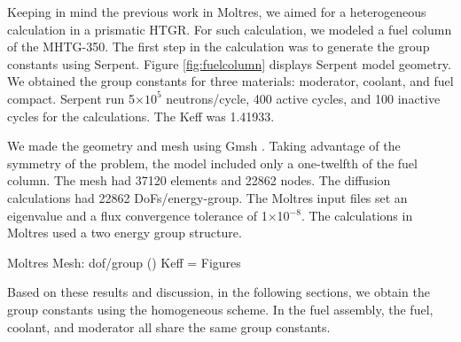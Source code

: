 \documentclass[11pt,letterpaper]{article}
\begin{document}
Keeping in mind the previous work in Moltres, we aimed for a heterogeneous calculation in a prismatic \gls{HTGR}.
For such calculation, we modeled a fuel column of the MHTG-350.
The first step in the calculation was to generate the group constants using Serpent.
Figure \ref{fig:fuelcolumn} displays Serpent model geometry.
We obtained the group constants for three materials: moderator, coolant, and fuel compact.
Serpent run 5$\times 10^5$ neutrons/cycle, 400 active cycles, and 100 inactive cycles for the calculations.
The \gls{Keff} was 1.41933.

We made the geometry and mesh using Gmsh \cite{geuzaine_gmsh_2020}.
Taking advantage of the symmetry of the problem, the model included only a one-twelfth of the fuel column.
The mesh had 37120 elements and 22862 nodes.
The diffusion calculations had 22862 \glspl{DoF}/energy-group.
The Moltres input files set an eigenvalue and a flux convergence tolerance of 1$\times$10$^{-8}$.
The calculations in Moltres used a two energy group structure.

Moltres
Mesh: dof/group ()
Keff = 
Figures



Based on these results and discussion, in the following sections, we obtain the group constants using the homogeneous scheme.
In the fuel assembly, the fuel, coolant, and moderator all share the same group constants.
\end{document}
